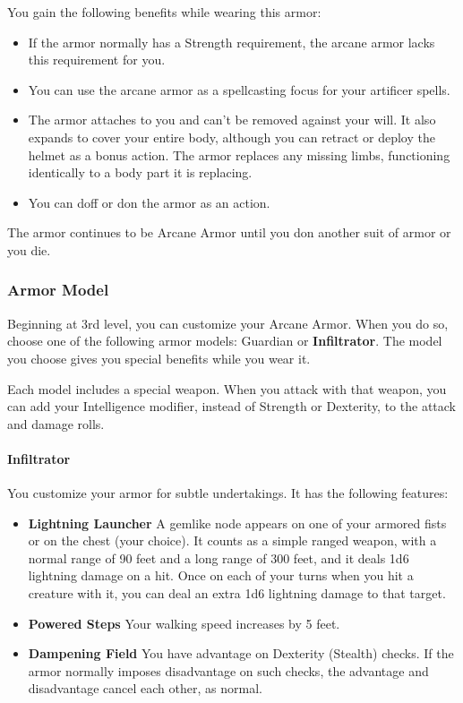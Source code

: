\documentclass[letterpaper,openany,oneside,twocolumn]{book}
\begin{document}
You gain the following benefits while wearing this armor:

\begin{itemize}
	\item If the armor normally has a Strength requirement, the arcane armor lacks this requirement for you.
	\item You can use the arcane armor as a spellcasting focus for your artificer spells.
	\item The armor attaches to you and can't be removed against your will. It also expands to cover your entire body, although you can retract or deploy the helmet as a bonus action. The armor replaces any missing limbs, functioning identically to a body part it is replacing.
	\item You can doff or don the armor as an action.
\end{itemize}

The armor continues to be Arcane Armor until you don another suit of armor or you die.
\subsubsection*{Armor Model}
Beginning at 3rd level, you can customize your Arcane Armor. When you do so, choose one of the following armor models: Guardian or \textbf{Infiltrator}. The model you choose gives you special benefits while you wear it.

Each model includes a special weapon. When you attack with that weapon, you can add your Intelligence modifier, instead of Strength or Dexterity, to the attack and damage rolls.
\paragraph*{Infiltrator} You customize your armor for subtle undertakings. It has the following features:
\begin{itemize}
	\item \textbf{Lightning Launcher} A gemlike node appears on one of your armored fists or on the chest (your choice). It counts as a simple ranged weapon, with a normal range of 90 feet and a long range of 300 feet, and it deals 1d6 lightning damage on a hit. Once on each of your turns when you hit a creature with it, you can deal an extra 1d6 lightning damage to that target.
	\item \textbf{Powered Steps} Your walking speed increases by 5 feet.
	\item \textbf{Dampening Field} You have advantage on Dexterity (Stealth) checks. If the armor normally imposes disadvantage on such checks, the advantage and disadvantage cancel each other, as normal.
\end{itemize}
\end{document}
